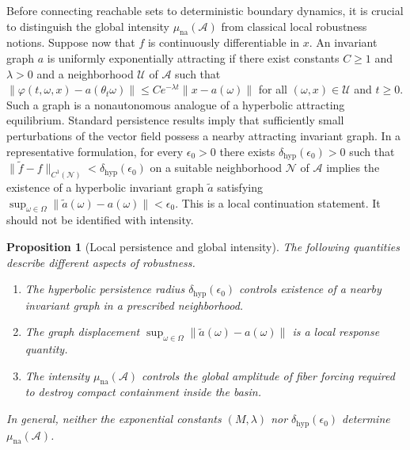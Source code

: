 \documentclass[pdflatex,sn-mathphys-num]{sn-jnl}
\numberwithin{equation}{section}
\theoremstyle{thmstyleone}%
\newtheorem{proposition}[theorem]{Proposition}
\theoremstyle{definition}
\theoremstyle{remark}
\begin{document}
Before connecting reachable sets to deterministic boundary dynamics, it is crucial to distinguish the global intensity $\mu_{\mathrm{na}}(\mathcal A)$ from classical local robustness notions. Suppose now that $f$ is continuously differentiable in $x$. An invariant graph $a$ is uniformly exponentially attracting if there exist constants $C\geq1$ and $\lambda>0$ and a neighborhood $\mathcal U$ of $\mathcal A$ such that $\|\varphi(t,\omega,x)-a(\theta_t\omega)\| \leq Ce^{-\lambda t} \|x-a(\omega)\|$ for all $(\omega,x)\in\mathcal U$ and $t\geq0$.  Such a graph is a nonautonomous analogue of a hyperbolic attracting equilibrium. Standard persistence results imply that sufficiently small perturbations of the vector field possess a nearby attracting invariant graph. In a representative formulation, for every $\epsilon_0>0$ there exists $\delta_{\mathrm{hyp}}(\epsilon_0)>0$ such that $\|\widetilde f-f\|_{C^1(\mathcal N)} < \delta_{\mathrm{hyp}}(\epsilon_0)$ on a suitable neighborhood $\mathcal N$ of $\mathcal A$ implies the existence of a hyperbolic invariant graph $\widetilde a$ satisfying $\sup_{\omega\in\Omega} \|\widetilde a(\omega)-a(\omega)\| < \epsilon_0$. This is a local continuation statement. It should not be identified with intensity.

\begin{proposition}[Local persistence and global intensity]
\label{prop:hyperbolicity-intensity-distinction}
The following quantities describe different aspects of robustness.
\begin{enumerate}
\item
The hyperbolic persistence radius $\delta_{\mathrm{hyp}}(\epsilon_0)$ controls existence of a nearby invariant graph in a prescribed neighborhood. 
\item
The graph displacement $\sup_{\omega\in\Omega}\|\widetilde a(\omega)-a(\omega)\|$ is a local response quantity.
\item
The intensity $\mu_{\mathrm{na}}(\mathcal A)$ controls the global amplitude of fiber forcing required to destroy compact containment inside the basin.
\end{enumerate}
In general, neither the exponential constants $(M,\lambda)$ nor $\delta_{\mathrm{hyp}}(\epsilon_0)$ determine
$\mu_{\mathrm{na}}(\mathcal A)$.
\end{proposition}
\end{document}
